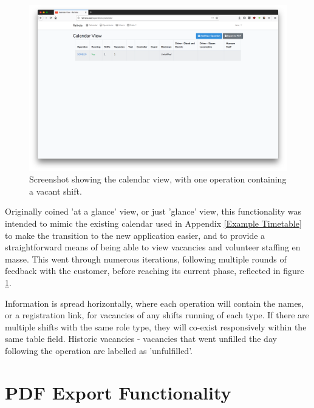\begin{figure}[!ht]
    \centering
    \includegraphics[width=1.0\textwidth]{Figures/screenshot-calendar}
    \caption{Screenshot showing the calendar view, with one operation containing a vacant shift.}
    \label{fig:calendarview}
\end{figure}

Originally coined 'at a glance' view, or just 'glance' view, this functionality was intended to mimic the existing calendar used in Appendix \ref{Example Timetable} to make the transition to the new application easier, and to provide a straightforward means of being able to view vacancies and volunteer staffing en masse. This went through numerous iterations, following multiple rounds of feedback with the customer, before reaching its current phase, reflected in figure \ref{fig:calendarview}.

Information is spread horizontally, where each operation will contain the names, or a registration link, for vacancies of any shifts running of each type. If there are multiple shifts with the same role type, they will co-exist responsively within the same table field. Historic vacancies - vacancies that went unfilled the day following the operation are labelled as 'unfulfilled'.

\section{PDF Export Functionality}

